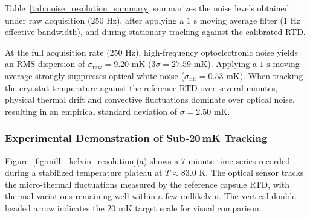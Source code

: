 \documentclass[preprint,11pt]{elsarticle}
\begin{document}
Table~\ref{tab:noise_resolution_summary} summarizes the noise levels obtained under raw acquisition ($250\text{ Hz}$), after applying a $1\text{ s}$ moving average filter ($1\text{ Hz}$ effective bandwidth), and during stationary tracking against the calibrated RTD.

\begin{table}[htpb]
    \centering
    \small
    \caption{Noise floor and thermal resolution limits for PEEK-4 fiber at $T \approx 83.0\text{ K}$.}
    \label{tab:noise_resolution_summary}
\end{table}

At the full acquisition rate ($250\text{ Hz}$), high-frequency optoelectronic noise yields an RMS dispersion of $\sigma_{\mathrm{raw}} = 9.20\text{ mK}$ ($3\sigma = 27.59\text{ mK}$). Applying a $1\text{ s}$ moving average strongly suppresses optical white noise ($\sigma_{\mathrm{filt}} = 0.53\text{ mK}$). When tracking the cryostat temperature against the reference RTD over several minutes, physical thermal drift and convective fluctuations dominate over optical noise, resulting in an empirical standard deviation of $\sigma = 2.50\text{ mK}$.

\subsubsection{Experimental Demonstration of Sub-20\,mK Tracking}

Figure~\ref{fig:milli_kelvin_resolution}(a) shows a 7-minute time series recorded during a stabilized temperature plateau at $T \approx 83.0\text{ K}$. The optical sensor tracks the micro-thermal fluctuations measured by the reference capsule RTD, with thermal variations remaining well within a few millikelvin. The vertical double-headed arrow indicates the $20\text{ mK}$ target scale for visual comparison.
\end{document}
